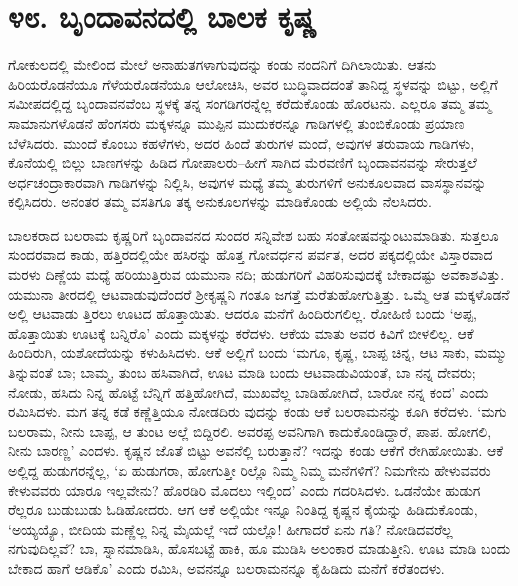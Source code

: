 
\chapter{೪೮. ಬೃಂದಾವನದಲ್ಲಿ ಬಾಲಕ ಕೃಷ್ಣ}

ಗೋಕುಲದಲ್ಲಿ ಮೇಲಿಂದ ಮೇಲೆ ಅನಾಹುತಗಳಾಗುವುದನ್ನು ಕಂಡು ನಂದನಿಗೆ ದಿಗಿಲಾಯಿತು. ಆತನು ಹಿರಿಯರೊಡನೆಯೂ ಗೆಳೆಯರೊಡನೆಯೂ ಆಲೋಚಿಸಿ, ಅವರ ಬುದ್ಧಿವಾದದಂತೆ ತಾನಿದ್ದ ಸ್ಥಳವನ್ನು ಬಿಟ್ಟು, ಅಲ್ಲಿಗೆ ಸಮೀಪದಲ್ಲಿದ್ದ ಬೃಂದಾವನವೆಂಬ ಸ್ಥಳಕ್ಕೆ ತನ್ನ ಸಂಗಡಿಗರನ್ನೆಲ್ಲ ಕರೆದುಕೊಂಡು ಹೊರಟನು. ಎಲ್ಲರೂ ತಮ್ಮ ತಮ್ಮ ಸಾಮಾನುಗಳೊಡನೆ ಹೆಂಗಸರು ಮಕ್ಕಳನ್ನೂ ಮುಪ್ಪಿನ ಮುದುಕರನ್ನೂ ಗಾಡಿಗಳಲ್ಲಿ ತುಂಬಿಕೊಂಡು ಪ್ರಯಾಣ ಬೆಳೆಸಿದರು. ಮುಂದೆ ಕೊಂಬು ಕಹಳೆಗಳು, ಅದರ ಹಿಂದೆ ತುರುಗಳ ಮಂದೆ, ಅವುಗಳ ತರುವಾಯ ಗಾಡಿಗಳು, ಕೊನೆಯಲ್ಲಿ ಬಿಲ್ಲು ಬಾಣಗಳನ್ನು ಹಿಡಿದ ಗೋಪಾಲರು–ಹೀಗೆ ಸಾಗಿದ ಮೆರವಣಿಗೆ ಬೃಂದಾವನವನ್ನು ಸೇರುತ್ತಲೆ ಅರ್ಧಚಂದ್ರಾಕಾರವಾಗಿ ಗಾಡಿಗಳನ್ನು ನಿಲ್ಲಿಸಿ, ಅವುಗಳ ಮಧ್ಯೆ ತಮ್ಮ ತುರುಗಳಿಗೆ ಅನುಕೂಲವಾದ ವಾಸಸ್ಥಾನವನ್ನು ಕಲ್ಪಿಸಿದರು. ಅನಂತರ ತಮ್ಮ ವಸತಿಗೂ ತಕ್ಕ ಅನುಕೂಲಗಳನ್ನು ಮಾಡಿಕೊಂಡು ಅಲ್ಲಿಯೆ ನೆಲಸಿದರು.

ಬಾಲಕರಾದ ಬಲರಾಮ ಕೃಷ್ಣರಿಗೆ ಬೃಂದಾವನದ ಸುಂದರ ಸನ್ನಿವೇಶ ಬಹು ಸಂತೋಷವನ್ನುಂಟುಮಾಡಿತು. ಸುತ್ತಲೂ ಸುಂದರವಾದ ಕಾಡು, ಹತ್ತಿರದಲ್ಲಿಯೇ ಹಸಿರನ್ನು ಹೊತ್ತ ಗೋವರ್ಧನ ಪರ್ವತ, ಅದರ ಪಕ್ಕದಲ್ಲಿಯೇ ವಿಸ್ತಾರವಾದ ಮರಳು ದಿಣ್ಣೆಯ ಮಧ್ಯೆ ಹರಿಯುತ್ತಿರುವ ಯಮುನಾ ನದಿ; ಹುಡುಗರಿಗೆ ವಿಹರಿಸುವುದಕ್ಕೆ ಬೇಕಾದಷ್ಟು ಅವಕಾಶವಿತ್ತು. ಯಮುನಾ ತೀರದಲ್ಲಿ ಆಟವಾಡುವುದೆಂದರೆ ಶ್ರೀಕೃಷ್ಣನಿ ಗಂತೂ ಜಗತ್ತೆ ಮರೆತುಹೋಗುತ್ತಿತ್ತು. ಒಮ್ಮೆ ಆತ ಮಕ್ಕಳೊಡನೆ ಅಲ್ಲಿ ಆಟವಾಡು ತ್ತಿರಲು ಊಟದ ಹೊತ್ತಾಯಿತು. ಆದರೂ ಮನೆಗೆ ಹಿಂದಿರುಗಲಿಲ್ಲ. ರೋಹಿಣಿ ಬಂದು ‘ಅಪ್ಪ, ಹೊತ್ತಾಯಿತು ಊಟಕ್ಕೆ ಬನ್ನಿರೊ’ ಎಂದು ಮಕ್ಕಳನ್ನು ಕರೆದಳು. ಆಕೆಯ ಮಾತು ಅವರ ಕಿವಿಗೆ ಬೀಳಲಿಲ್ಲ. ಆಕೆ ಹಿಂದಿರುಗಿ, ಯಶೋದೆಯನ್ನು ಕಳುಹಿಸಿದಳು. ಆಕೆ ಅಲ್ಲಿಗೆ ಬಂದು ‘ಮಗೂ, ಕೃಷ್ಣ, ಬಾಪ್ಪ ಚಿನ್ನ, ಆಟ ಸಾಕು, ಮಮ್ಮು ತಿನ್ನುವಂತೆ ಬಾ; ಬಾಮ್ಮ, ತುಂಬ ಹಸಿವಾಗಿದೆ, ಊಟ ಮಾಡಿ ಬಂದು ಆಟವಾಡುವಿಯಂತೆ, ಬಾ ನನ್ನ ದೇವರು; ನೋಡು, ಹಸಿದು ನಿನ್ನ ಹೊಟ್ಟೆ ಬೆನ್ನಿಗೆ ಹತ್ತಿಹೋಗಿದೆ, ಮುಖವೆಲ್ಲ ಬಾಡಿಹೋಗಿದೆ, ಬಾರೋ ನನ್ನ ಕಂದ’ ಎಂದು ರಮಿಸಿದಳು. ಮಗ ತನ್ನ ಕಡೆ ಕಣ್ಣೆತ್ತಿಯೂ ನೋಡದಿರು ವುದನ್ನು ಕಂಡು ಆಕೆ ಬಲರಾಮನನ್ನು ಕೂಗಿ ಕರೆದಳು. ‘ಮಗು ಬಲರಾಮ, ನೀನು ಬಾಪ್ಪ, ಆ ತುಂಟ ಅಲ್ಲೆ ಬಿದ್ದಿರಲಿ. ಅವರಪ್ಪ ಅವನಿಗಾಗಿ ಕಾದುಕೊಂಡಿದ್ದಾರೆ, ಪಾಪ. ಹೋಗಲಿ, ನೀನು ಬಾರಣ್ಣ’ ಎಂದಳು. ಕೃಷ್ಣನ ಜೊತೆ ಬಿಟ್ಟು ಅವನೆಲ್ಲಿ ಬರುತ್ತಾನೆ? ಇದನ್ನು ಕಂಡು ಆಕೆಗೆ ರೇಗಿಹೋಯಿತು. ಆಕೆ ಅಲ್ಲಿದ್ದ ಹುಡುಗರನ್ನೆಲ್ಲ, ‘ಏ ಹುಡುಗರಾ, ಹೋಗುತ್ತೀ ರಿಲ್ಲೊ ನಿಮ್ಮ ನಿಮ್ಮ ಮನೆಗಳಿಗೆ? ನಿಮಗೇನು ಹೇಳುವವರು ಕೇಳುವವರು ಯಾರೂ ಇಲ್ಲವೇನು? ಹೊರಡಿರಿ ಮೊದಲು ಇಲ್ಲಿಂದ’ ಎಂದು ಗದರಿಸಿದಳು. ಒಡನೆಯೇ ಹುಡುಗ ರೆಲ್ಲರೂ ಬುಡುಬುಡು ಓಡಿಹೋದರು. ಆಗ ಆಕೆ ಅಲ್ಲಿಯೇ ಇನ್ನೂ ನಿಂತಿದ್ದ ಕೃಷ್ಣನ ಕೈಯನ್ನು ಹಿಡಿದುಕೊಂಡು, ‘ಅಯ್ಯಯ್ಯೊ, ಬೀದಿಯ ಮಣ್ಣೆಲ್ಲ ನಿನ್ನ ಮೈಯಲ್ಲೆ ಇದೆ ಯಲ್ಲೊ! ಹೀಗಾದರೆ ಏನು ಗತಿ? ನೋಡಿದವರೆಲ್ಲ ನಗುವುದಿಲ್ಲವೆ? ಬಾ, ಸ್ನಾನಮಾಡಿಸಿ, ಹೊಸಬಟ್ಟೆ ಹಾಕಿ, ಹೂ ಮುಡಿಸಿ ಅಲಂಕಾರ ಮಾಡುತ್ತೀನಿ. ಊಟ ಮಾಡಿ ಬಂದು ಬೇಕಾದ ಹಾಗೆ ಆಡಿಕೊ’ ಎಂದು ರಮಿಸಿ, ಅವನನ್ನೂ ಬಲರಾಮನನ್ನೂ ಕೈಹಿಡಿದು ಮನೆಗೆ ಕರೆತಂದಳು.

